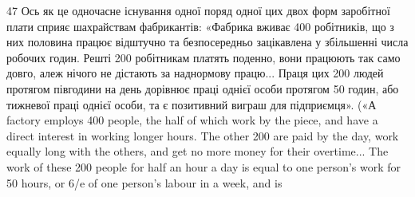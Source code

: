 47    Ось як це одночасне існування одної поряд одної цих двох форм
заробітної плати сприяє шахрайствам фабрикантів: «Фабрика вживає
400 робітників, що з них половина працює відштучно та безпосередньо
зацікавлена у збільшенні числа робочих годин. Решті 200 робітникам
платять поденно, вони працюють так само довго, алеж нічого не дістають
за наднормову працю... Праця цих 200 людей протягом півгодини
на день дорівнює праці однієї особи протягом 50 годин, або  тижневої
праці однієї особи, та є позитивний виграш для підприємця». («А factory
employs 400 people, the half of which work by the piece, and have a direct
interest in working longer hours. The other 200 are paid by the day,
work equally long with the others, and get no more money for their overtime...
The work of these 200 people for half an hour a day is equal to one
person’s work for 50 hours, or 6/e of one person’s labour in a week, and is
